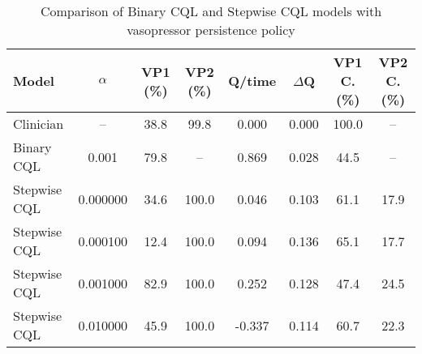 \begin{table}[ht]
\centering
\caption{Comparison of Binary CQL and Stepwise CQL models with vasopressor persistence policy}
\label{tab:stepwise_comparison}
\begin{tabular}{lccccccc}
\toprule
Model & $\alpha$ & VP1 (\%) & VP2 (\%) & Q/time & $\Delta$Q & VP1 C. (\%) & VP2 C. (\%) \\
\midrule
Clinician & -- & 38.8 & 99.8 & 0.000 & 0.000 & 100.0 & -- \\
\midrule
Binary CQL & 0.001 & 79.8 & -- & 0.869 & 0.028 & 44.5 & -- \\
Stepwise CQL & 0.000000 & 34.6 & 100.0 & 0.046 & 0.103 & 61.1 & 17.9 \\
Stepwise CQL & 0.000100 & 12.4 & 100.0 & 0.094 & 0.136 & 65.1 & 17.7 \\
Stepwise CQL & 0.001000 & 82.9 & 100.0 & 0.252 & 0.128 & 47.4 & 24.5 \\
Stepwise CQL & 0.010000 & 45.9 & 100.0 & -0.337 & 0.114 & 60.7 & 22.3 \\
\bottomrule
\end{tabular}
\end{table}